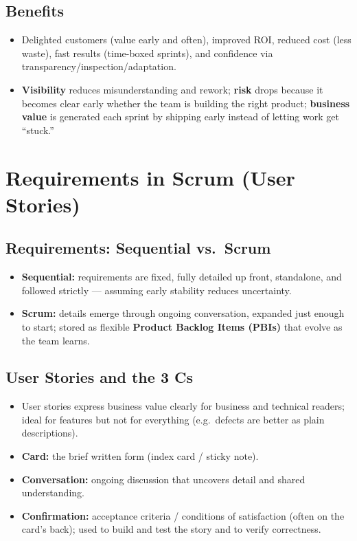 \documentclass[hidelinks]{article}
\begin{document}
\subsection{Benefits}
\begin{itemize}
  \item Delighted customers (value early and often), improved ROI, reduced cost (less waste),
        fast results (time-boxed sprints), and confidence via transparency/inspection/adaptation.
  \item \textbf{Visibility} reduces misunderstanding and rework; \textbf{risk} drops because it
        becomes clear early whether the team is building the right product; \textbf{business value}
        is generated each sprint by shipping early instead of letting work get ``stuck.''
\end{itemize}

\section{Requirements in Scrum (User Stories)}

\subsection{Requirements: Sequential vs.\ Scrum}
\begin{itemize}
  \item \textbf{Sequential:} requirements are fixed, fully detailed up front, standalone, and
        followed strictly --- assuming early stability reduces uncertainty.
  \item \textbf{Scrum:} details emerge through ongoing conversation, expanded just enough to start;
        stored as flexible \textbf{Product Backlog Items (PBIs)} that evolve as the team learns.
\end{itemize}

\subsection{User Stories and the 3 Cs}
\begin{itemize}
  \item User stories express business value clearly for business and technical readers; ideal for
        features but not for everything (e.g.\ defects are better as plain descriptions).
  \item \textbf{Card:} the brief written form (index card / sticky note).
  \item \textbf{Conversation:} ongoing discussion that uncovers detail and shared understanding.
  \item \textbf{Confirmation:} acceptance criteria / conditions of satisfaction (often on the
        card's back); used to build and test the story and to verify correctness.
\end{itemize}
\end{document}
